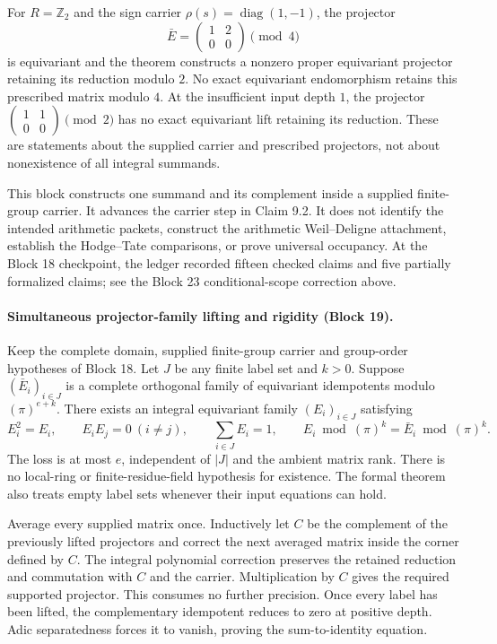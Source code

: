 \documentclass[11pt]{article}
\theoremstyle{definition}
\theoremstyle{remark}
\begin{document}
For $R=\mathbb Z_2$ and the sign carrier
$\rho(s)=\operatorname{diag}(1,-1)$, the projector
\[
\bar E=\begin{pmatrix}1&2\\0&0\end{pmatrix}\pmod4
\]
is equivariant and the theorem constructs a nonzero proper equivariant
projector retaining its reduction modulo $2$. No exact equivariant
endomorphism retains this prescribed matrix modulo $4$. At the insufficient
input depth $1$, the projector
$\left(\begin{smallmatrix}1&1\\0&0\end{smallmatrix}\right)\pmod2$
has no exact equivariant lift retaining its reduction. These are statements
about the supplied carrier and prescribed projectors, not about nonexistence
of all integral summands.

This block constructs one summand and its complement inside a supplied
finite-group carrier. It advances the carrier step in Claim 9.2. It does
not identify the intended arithmetic packets, construct the arithmetic
Weil--Deligne attachment, establish the Hodge--Tate comparisons, or prove
universal occupancy. At the Block 18 checkpoint, the ledger recorded fifteen
checked claims and five partially formalized claims; see the Block 23
conditional-scope correction above.


\paragraph{Simultaneous projector-family lifting and rigidity (Block 19).}
Keep the complete domain, supplied finite-group carrier and group-order
hypotheses of Block 18. Let $J$ be any finite label set and $k>0$. Suppose
$(\bar E_i)_{i\in J}$ is a complete orthogonal family of equivariant
idempotents modulo $(\pi)^{e+k}$. There exists an integral equivariant
family $(E_i)_{i\in J}$ satisfying
\[
E_i^2=E_i,\qquad E_iE_j=0\ (i\ne j),\qquad
\sum_{i\in J}E_i=1,\qquad
E_i\bmod(\pi)^k=\bar E_i\bmod(\pi)^k.
\]
The loss is at most $e$, independent of $|J|$ and the ambient matrix rank.
There is no local-ring or finite-residue-field hypothesis for existence.
The formal theorem also treats empty label sets whenever their input
equations can hold.

Average every supplied matrix once. Inductively let $C$ be the complement
of the previously lifted projectors and correct the next averaged matrix
inside the corner defined by $C$. The integral polynomial correction
preserves the retained reduction and commutation with $C$ and the carrier.
Multiplication by $C$ gives the required supported projector. This consumes
no further precision. Once every label has been lifted, the complementary
idempotent reduces to zero at positive depth. Adic separatedness forces it
to vanish, proving the sum-to-identity equation.
\end{document}
